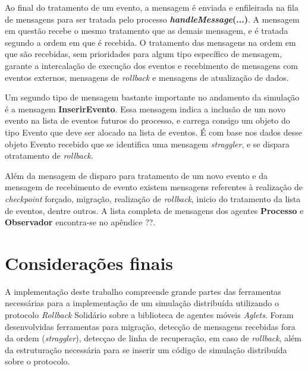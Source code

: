 Ao final do tratamento de um evento, a mensagem é enviada e enfileirada na fila de mensagens para ser tratada pelo processo \textbf{\textit{handleMessage}(...)}. A mensagem em questão recebe o mesmo tratamento que as demais mensagem, e é tratada segundo a ordem em que é recebida. O tratamento das mensagens na ordem em que são recebidas, sem prioridades para algum tipo específico de mensagem, garante a intercalação de execução dos eventos e recebimento de mensagens com eventos externos, mensagens de \textit{rollback} e mensagens de atualização de dados.


Um segundo tipo de mensagem bastante importante no andamento da simulação é a mensagem \textbf{InserirEvento}. Essa mensagem indica a inclusão de um novo evento na lista de eventos futuros do processo, e carrega consigo um objeto do tipo Evento que deve ser alocado na lista de eventos. É com base nos dados desse objeto Evento recebido que se identifica uma mensagem \textit{straggler}, e se dispara otratamento de \textit{rollback}.


Além da mensagem de disparo para tratamento de um novo evento e da mensagem de recebimento de evento existem mensagens referentes à realização de \textit{checkpoint} forçado, migração, realização de \textit{rollback}, inicio do tratamento da lista de eventos, dentre outros. A lista completa de mensagens dos agentes \textbf{Processo} e \textbf{Observador} encontra-se no apêndice ??.

\section{Considerações finais}

	A implementação deste trabalho compreende grande partes das ferramentas necessárias para a implementação de um simulação distribuída utilizando o protocolo \textit{Rollback} Solidário sobre a biblioteca de agentes móveis \textit{Aglets}. Foram desenvolvidas ferramentas para migração, detecção de mensagens recebidas fora da ordem (\textit{straggler}), detecçao de linha de recuperação, em caso de \textit{rollback}, além da estruturação necessária para se inserir um código de simulação distribuída sobre o protocolo.

